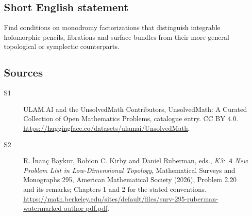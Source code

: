 \documentclass[11pt]{article}
\begin{document}
\subsection{Short English statement}
Find conditions on monodromy factorizations that distinguish integrable holomorphic pencils, fibrations and surface bundles from their more general topological or symplectic counterparts.
\subsection{Sources}
\begin{description}
\item[\hypertarget{source:statement:1}{S1}] ULAM.AI and the UnsolvedMath Contributors, UnsolvedMath: A Curated Collection of Open Mathematics Problems, catalogue entry. CC BY 4.0. \url{https://huggingface.co/datasets/ulamai/UnsolvedMath}.
\item[\hypertarget{source:statement:2}{S2}] R. İnanç Baykur, Robion C. Kirby and Daniel Ruberman, eds., \emph{K3: A New Problem List in Low-Dimensional Topology}, Mathematical Surveys and Monographs 295, American Mathematical Society (2026), Problem 2.20 and its remarks; Chapters 1 and 2 for the stated conventions. \url{https://math.berkeley.edu/sites/default/files/surv-295-ruberman-watermarked-author-pdf.pdf}.
\end{description}
\label{end:statement}
\end{document}
